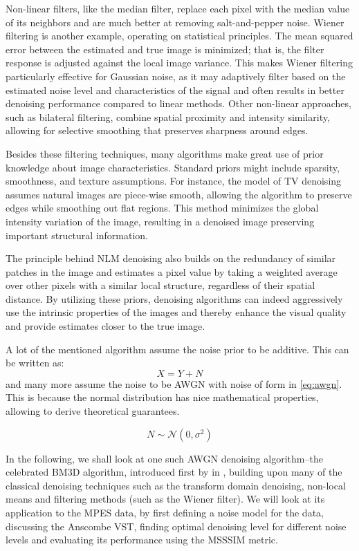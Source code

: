 Non-linear filters, like the median filter, replace each pixel with the median value of its neighbors and are much better at removing salt-and-pepper noise. Wiener filtering is another example, operating on statistical principles. The mean squared error between the estimated and true image is minimized; that is, the filter response is adjusted against the local image variance. This makes Wiener filtering particularly effective for Gaussian noise, as it may adaptively filter based on the estimated noise level and characteristics of the signal and often results in better denoising performance compared to linear methods. Other non-linear approaches, such as bilateral filtering, combine spatial proximity and intensity similarity, allowing for selective smoothing that  preserves sharpness around edges. 

Besides these filtering techniques, many algorithms make great use of prior knowledge about image characteristics. Standard priors might include sparsity, smoothness, and texture assumptions. For instance, the model of TV denoising assumes natural images are piece-wise smooth, allowing the algorithm to preserve edges while smoothing out flat regions. This method minimizes the global intensity variation of the image, resulting in a denoised image preserving important structural information.

The principle behind \gls{NLM} denoising also builds on the redundancy of similar patches in the image and estimates a pixel value by taking a weighted average over other pixels with a similar local structure, regardless of their spatial distance. By utilizing these priors, denoising algorithms can indeed aggressively use the intrinsic properties of the images and thereby enhance the visual quality and provide estimates closer to the true image.

A lot of the mentioned algorithm assume the noise prior to be additive. This can be written as:
\begin{equation}
    X = Y + N
\end{equation}
and many more assume the noise to be \gls{AWGN} with noise of form in \cref{eq:awgn}. This is because the normal distribution has nice mathematical properties, allowing to derive theoretical guarantees.

\begin{equation}\label{eq:awgn}
    N \sim \mathcal{N}(0, \sigma^2)
\end{equation}

In the following, we shall look at one such \gls{AWGN} denoising algorithm--the celebrated \gls{BM3D} algorithm, introduced first by \citeauthor{dabovImageDenoisingSparse2007} in \cite{dabovImageDenoisingSparse2007}, building upon many of the classical denoising techniques such as the transform domain denoising, non-local means and filtering methods (such as the Wiener filter). We will look at its application to the \gls{MPES} data, by first defining a noise model for the data, discussing the Anscombe \gls{VST}, finding optimal denoising level for different noise levels and evaluating its performance using the \gls{MSSSIM} metric.


